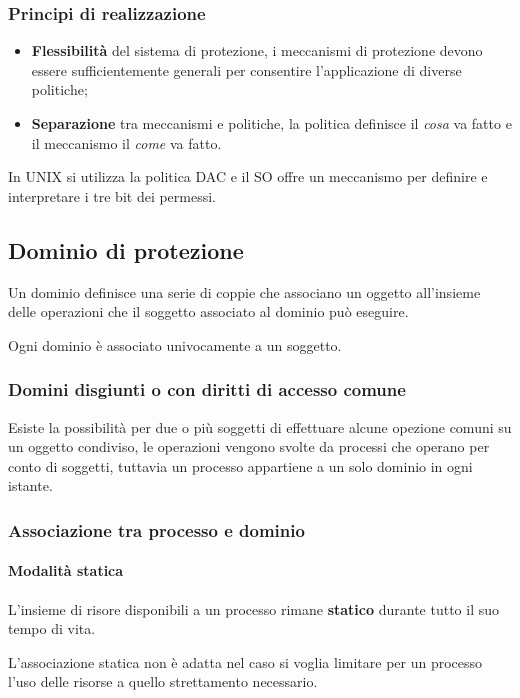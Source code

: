 \subsubsection{Principi di realizzazione}

\begin{itemize}
	\item \textbf{Flessibilità} del sistema di protezione, i meccanismi di protezione devono essere sufficientemente generali per consentire l'applicazione di diverse politiche;
	\item \textbf{Separazione} tra meccanismi e politiche, la politica definisce il \textit{cosa} va fatto e il meccanismo il \textit{come} va fatto.
\end{itemize}

In UNIX si utilizza la politica DAC e il SO offre un meccanismo per definire e interpretare i tre bit dei permessi.

\subsection{Dominio di protezione}
Un dominio definisce una serie di coppie che associano un oggetto all'insieme delle operazioni che il soggetto associato al dominio può eseguire.

Ogni dominio è associato univocamente a un soggetto.

\subsubsection{Domini disgiunti o con diritti di accesso comune}

Esiste la possibilità per due o più soggetti di effettuare alcune opezione comuni su un oggetto condiviso, le operazioni vengono svolte da processi che operano per conto di soggetti, tuttavia un processo appartiene a un solo dominio in ogni istante.

\subsubsection{Associazione tra processo e dominio}

\paragraph{Modalità statica}
L'insieme di risore disponibili a un processo rimane \textbf{statico} durante tutto il suo tempo di vita.

L'associazione statica non è adatta nel caso si voglia limitare per un processo l'uso delle risorse a quello strettamento necessario.

